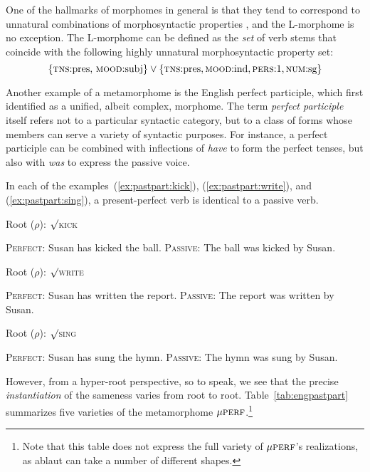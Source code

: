 One of the hallmarks of morphomes in general is that they tend to
correspond to unnatural combinations of morphosyntactic 
properties \citep{aronoff:md:2016}, and the L-morphome is no exception. 
The L-morphome can be defined as the \emph{set} of verb 
stems that coincide with the following highly unnatural morphosyntactic property set:
\begin{equation}
\{ \text{\textsc{tns}:pres, \textsc{mood}:subj}\} \vee \{\text{\textsc{tns}:pres},\text{\textsc{mood}:ind},\text{\textsc{pers}:1},\text{\textsc{num}:sg}\}
\end{equation}

Another example of a metamorphome is the English perfect participle, which \citet{aronoff:1994} first 
identified as a unified, albeit complex, morphome.  The term \emph{perfect participle} 
itself refers not to a particular syntactic category, but 
to a class of 
forms whose members 
can serve a variety of  syntactic purposes. For instance, a perfect participle can be combined
with inflections of \emph{have} to form the perfect tenses, but also with 
\emph{was} to express the passive voice. 

In each of the examples~(\ref{ex:pastpart:kick}), (\ref{ex:pastpart:write}), and (\ref{ex:pastpart:sing}), a present-perfect verb is identical to 
a passive verb.
\begin{exe}
\label{ex:pastpart}
	\ex Root ($\rho$): $\surd$\textsc{kick}
		\begin{xlist} \label{ex:pastpart:kick}
		\ex \textsc{Perfect:} Susan has kicked the ball. \label{ex:pastpart:kick:perf}
		\ex \textsc{Passive:} The ball was kicked by Susan.\label{ex:pastpart:kick:pass}
		\end{xlist}
	\ex Root ($\rho$): $\surd$\textsc{write}
		\begin{xlist} \label{ex:pastpart:write}
		\ex \textsc{Perfect:} Susan has written the report. \label{ex:pastpart:write:perf}
		\ex \textsc{Passive:} The report was written by Susan. \label{ex:pastpart:write:pass}
		\end{xlist}
	\ex Root ($\rho$): $\surd$\textsc{sing}
		\begin{xlist} \label{ex:pastpart:sing}
		\ex \textsc{Perfect:} Susan has sung the hymn. \label{ex:pastpart:sing:perf}
		\ex \textsc{Passive:} The hymn was sung by Susan. \label{ex:pastpart:sing:pass}
		\end{xlist}
\end{exe}
However,
from a hyper-root perspective, so to speak, we see that the precise \emph{instantiation} of the sameness varies from root to root.  
Table~\ref{tab:engpastpart} summarizes five varieties of the metamorphome $\mu{\textsc{perf}}$.\footnote{Note that this table
does not express the full variety of $\mu{\textsc{perf}}$'s realizations, as ablaut can take a number of different shapes.}

